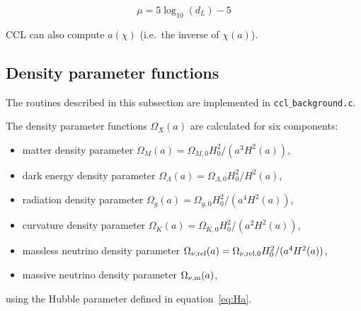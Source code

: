 \documentclass[\docopts]{\docclass}
\begin{document}
\begin{equation}\label{eq:distmod}
    \mu = 5 \log_{10}(d_L)-5
\end{equation}


CCL can also compute $a(\chi)$ (i.e.\ the inverse of $\chi(a)$).


\subsection{Density parameter functions}
\label{subsec:densityparam}

The routines described in this subsection are implemented in {\tt ccl$\_$background.c}.

The density parameter functions $\Omega_X(a)$ are calculated for six components:
\begin{itemize}
\item matter density parameter $\Omega_M(a) = \Omega_{M,0} H_0^2 / (a^3 H^2(a) )$,
\item dark energy density parameter $\Omega_\Lambda(a) = \Omega_{\Lambda,0} H_0^2 / H^2(a)$,
\item radiation density parameter $\Omega_g(a) = \Omega_{g,0} H_0^2 / (a^4 H^2(a) )$,
\item curvature density parameter $\Omega_K(a) = \Omega_{K,0} H_0^2 / (a^2 H^2(a) )$,
\item massless neutrino density parameter $\Omega_{\nu, {\rm rel}}(a) = \Omega_{\nu, {\rm rel},0} H_0^2 / (a^4 H^2(a) )$,
\item massive neutrino density parameter $\Omega_{\nu, {\rm m}}(a)$,
\end{itemize}
using the Hubble parameter defined in equation~\ref{eq:Ha}.
\end{document}
